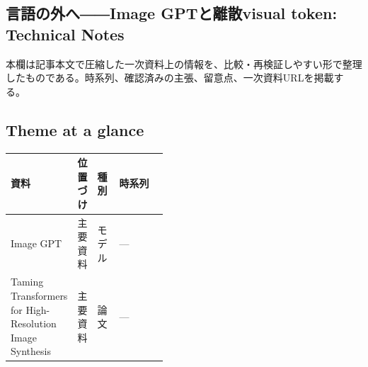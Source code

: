 \subsection*{言語の外へ――Image GPTと離散visual token: Technical Notes}
本欄は記事本文で圧縮した一次資料上の情報を、比較・再検証しやすい形で整理したものである。時系列、確認済みの主張、留意点、一次資料URLを掲載する。
\medskip
\subsection*{Theme at a glance}
\begin{center}
\footnotesize
\begin{tabularx}{\linewidth}{@{}p{0.20\linewidth}p{0.10\linewidth}p{0.14\linewidth}X@{}}
\toprule
資料 & 位置づけ & 種別 & 時系列 \\
\midrule
Image GPT & 主要資料 & モデル & — \\
Taming Transformers for High-Resolution Image Synthesis & 主要資料 & 論文 & — \\
\bottomrule
\end{tabularx}
\end{center}
\normalsize

